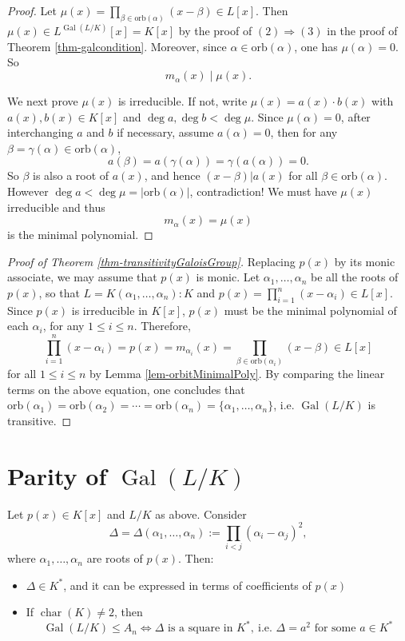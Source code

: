 \begin{proof}
    Let $\mu(x)=\prod_{\beta\in \mathrm{orb}(\alpha)}(x-\beta)\in L[x]$. Then $\mu(x)\in L^{\operatorname{Gal}(L/K)}[x]=K[x]$ by the proof of $(2) \Rightarrow (3)$ in the proof of Theorem \ref{thm-galcondition}. Moreover, since $\alpha \in \mathrm{orb}(\alpha)$, one has $\mu(\alpha)=0$. So 
    $$m_{\alpha}(x)\mid \mu(x).$$ 
    
    We next prove $\mu(x)$ is irreducible. If not, write $\mu(x)=a(x)\cdot b(x)$ with $a(x), b(x)\in K[x]$ and $\deg a, \deg b<\deg \mu$. Since $\mu(\alpha)=0$, after interchanging $a$ and $b$ if necessary, assume $a(\alpha)=0$, then for any $\beta=\gamma(\alpha)\in \mathrm{orb}(\alpha)$, 
    \[a(\beta)=a(\gamma(\alpha))=\gamma(a(\alpha))=0.\]
    So $\beta$ is also a root of $a(x)$, and hence $(x-\beta) | a(x)$ for all $\beta \in \mathrm{orb}(\alpha)$.
    However $\deg a<\deg \mu=\left| \mathrm{orb}(\alpha) \right| $, contradiction! 
    We must have $\mu(x)$ irreducible and thus 
    $$m_{\alpha}(x) = \mu(x)$$ 
    is the minimal polynomial. 
\end{proof}

\begin{proof}[Proof of Theorem \ref{thm-transitivityGaloisGroup}]
    Replacing $p(x)$ by its monic associate, we may assume that $p(x)$ is monic. Let $\alpha_{1},\dots, \alpha_{n}$ be all the roots of $p(x)$, so that
    $L=K(\alpha_{1},\dots, \alpha_{n}):K$ and $p(x)=\prod_{i=1}^{n}(x-\alpha_{i})\in L[x]$. 
    Since $p(x)$ is irreducible in $K[x]$, $p(x)$ must be the minimal polynomial of each $\alpha_{i}$, for any $1\leq i\leq n$. Therefore, 
    $$\prod_{i=1}^{n}(x-\alpha_{i}) = p(x) = m_{\alpha_i}(x) = \prod_{\beta\in \mathrm{orb}(\alpha_i)}(x-\beta)\in L[x]$$
    for all $1 \leq i \leq n$ by Lemma \ref{lem-orbitMinimalPoly}. By comparing the linear terms on the above equation, one concludes that $\mathrm{orb}(\alpha_{1})=\mathrm{orb}(\alpha_{2})=\cdots=\mathrm{orb}(\alpha_{n}) = \{\alpha_1, \dots, \alpha_n\}$, i.e. $\operatorname{Gal}(L/K)$ is transitive.
\end{proof}

\section{Parity of $\operatorname{Gal}(L/K)$}
\begin{theorem} \label{thm-discrim}
Let $ p(x) \in K[x] $ and $ L/K $ as above. Consider 
$$
\Delta = \Delta(\alpha_1,\ldots,\alpha_n) := \prod_{i<j} (\alpha_i - \alpha_j)^2,
$$ 
where $ \alpha_1,\ldots,\alpha_n $ are roots of $ p(x) $. Then:
\begin{itemize}
    \item $ \Delta \in K^* $, and it can be expressed in terms of coefficients of $ p(x) $
    \item If $ \operatorname{char}(K) \neq 2 $, then
    $$
    \operatorname{Gal}(L/K) \leq A_n \iff \Delta \text{ is a square in } K^*,\ \text{i.e. }\Delta = a^2 \text{ for some } a \in K^*
    $$
\end{itemize}
\end{theorem}

